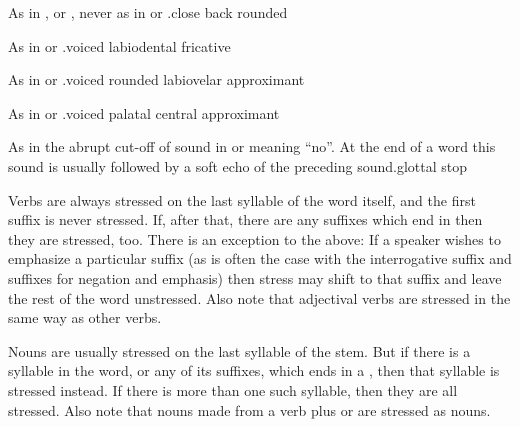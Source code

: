 %
  {\textipa{[u]} As in ,  or ,
  never as in  or .}{close back rounded}

%
  {\textipa{[v]} As in  or
  .}{voiced labiodental fricative}

%
  {\textipa{[w]} As in  or .}{voiced
  rounded labiovelar approximant}

%
  {\textipa{[j]} As in  or .}{voiced palatal
  central approximant}

%
  {\textipa{[P]} As in the abrupt cut-off of sound in  or
  \mbox{} meaning ``no''. At the end of a word this sound
  is usually followed by a soft echo of the preceding sound.}{glottal
  stop}



\noindent Verbs are always stressed on the last syllable of the word
itself, and the first suffix is never stressed. If, after that, there
are any suffixes which end in  then they are stressed, too. There
is an exception to the above: If a speaker wishes to emphasize a
particular suffix (as is often the case with the interrogative suffix
and suffixes for negation and emphasis) then stress may shift to that
suffix and leave the rest of the word unstressed. Also note that
adjectival verbs are stressed in the same way as other verbs.

Nouns are usually stressed on the last syllable of the stem. But if
there is a syllable in the word, or any of its suffixes, which ends in
a , then that syllable is stressed instead. If there is more than
one such syllable, then they are all stressed. Also note that nouns
made from a verb plus  or  are stressed as nouns.

\clearpage
